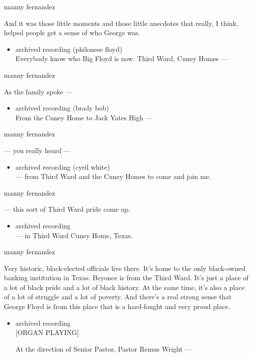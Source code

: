 manny fernandez

And it was those little moments and those little anecdotes that really,
I think, helped people get a sense of who George was.

\begin{itemize}
\tightlist
\item
  archived recording (philonese floyd)\\
  Everybody know who Big Floyd is now. Third Ward, Cuney Homes ---
\end{itemize}

manny fernandez

As the family spoke ---

\begin{itemize}
\tightlist
\item
  archived recording (brady bob)\\
  From the Cuney Home to Jack Yates High ---
\end{itemize}

manny fernandez

--- you really heard ---

\begin{itemize}
\tightlist
\item
  archived recording (cyril white)\\
  --- from Third Ward and the Cuney Homes to come and join me.
\end{itemize}

manny fernandez

--- this sort of Third Ward pride come up.

\begin{itemize}
\tightlist
\item
  archived recording\\
  --- in Third Ward Cuney Home, Texas.
\end{itemize}

manny fernandez

Very historic, black-elected officials live there. It's home to the only
black-owned banking institution in Texas. Beyonce is from the Third
Ward. It's just a place of a lot of black pride and a lot of black
history. At the same time, it's also a place of a lot of struggle and a
lot of poverty. And there's a real strong sense that George Floyd is
from this place that is a hard-fought and very proud place.

\begin{itemize}
\item
  archived recording\\
  {[}ORGAN PLAYING{]}

  At the direction of Senior Pastor, Pastor Remus Wright ---
\end{itemize}

